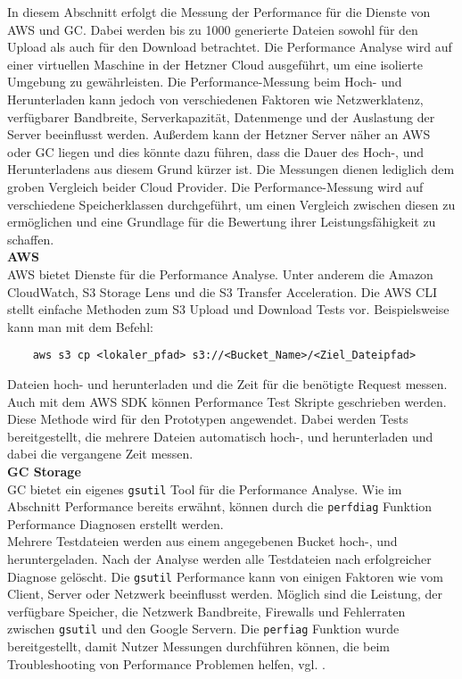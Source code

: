 In diesem Abschnitt erfolgt die Messung der Performance für die Dienste von AWS und GC. Dabei werden bis zu 1000 generierte Dateien sowohl für den Upload als auch für den Download betrachtet. Die Performance Analyse wird auf einer virtuellen Maschine in der Hetzner Cloud ausgeführt, um eine isolierte Umgebung zu gewährleisten. Die Performance-Messung beim Hoch- und Herunterladen kann jedoch von verschiedenen Faktoren wie Netzwerklatenz, verfügbarer Bandbreite, Serverkapazität, Datenmenge und der Auslastung der Server beeinflusst werden. Außerdem kann der Hetzner Server näher an AWS oder GC liegen und dies könnte dazu führen, dass die Dauer des Hoch-, und Herunterladens aus diesem Grund kürzer ist. Die Messungen dienen lediglich dem groben Vergleich beider Cloud Provider. Die Performance-Messung wird auf verschiedene Speicherklassen durchgeführt, um einen Vergleich zwischen diesen zu ermöglichen und eine Grundlage für die Bewertung ihrer Leistungsfähigkeit zu schaffen.\\

\textbf{AWS}\\

AWS bietet Dienste für die Performance Analyse. Unter anderem die Amazon CloudWatch, S3 Storage Lens und die S3 Transfer Acceleration. Die AWS CLI stellt einfache Methoden zum S3 Upload und Download Tests vor. Beispielsweise kann man mit dem Befehl:

\begin{lstlisting}
	aws s3 cp <lokaler_pfad> s3://<Bucket_Name>/<Ziel_Dateipfad>
\end{lstlisting}

Dateien hoch- und herunterladen und die Zeit für die benötigte Request messen. Auch mit dem AWS SDK können Performance Test Skripte geschrieben werden. Diese Methode wird für den Prototypen angewendet. Dabei werden Tests bereitgestellt, die mehrere Dateien automatisch hoch-, und herunterladen und dabei die vergangene Zeit messen.\\ 

\textbf{GC Storage}\\

GC bietet ein eigenes \verb|gsutil| Tool für die Performance Analyse. Wie im Abschnitt Performance bereits erwähnt, können durch die \verb|perfdiag| Funktion Performance Diagnosen erstellt werden.\\ 

Mehrere Testdateien werden aus einem angegebenen Bucket hoch-, und heruntergeladen. Nach der Analyse werden alle Testdateien nach erfolgreicher Diagnose gelöscht. Die \verb|gsutil| Performance kann von einigen Faktoren wie vom Client, Server oder Netzwerk beeinflusst werden. Möglich sind die Leistung, der verfügbare Speicher, die Netzwerk Bandbreite, Firewalls und Fehlerraten zwischen \verb|gsutil| und den Google Servern. Die \verb|perfiag| Funktion wurde bereitgestellt, damit Nutzer Messungen durchführen können, die beim Troubleshooting von Performance Problemen helfen, vgl. \cite{gc-perfdiag}.\\

